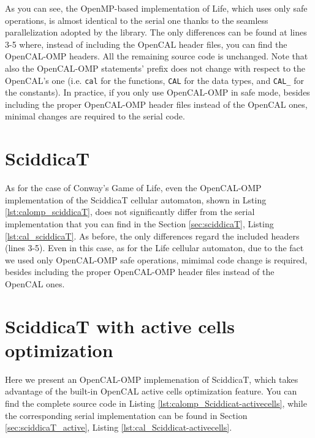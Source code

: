 As you can see, the OpenMP-based implementation of Life, which uses
only safe operations, is almost identical to the serial one thanks to the seamless parallelization adopted by the library. 
The only differences can be found at lines 3-5 where, instead of including the
OpenCAL header files, you can find the OpenCAL-OMP headers. All the
remaining source code is unchanged. Note that also the OpenCAL-OMP
statements' prefix does not change with respect to the OpenCAL's one
(i.e. \verb'cal' for the functions, \verb'CAL' for the data types, and
\verb'CAL_' for the constants). In practice, if you only use
OpenCAL-OMP in safe mode, besides including the proper OpenCAL-OMP
header files instead of the OpenCAL ones, minimal changes are required to the
serial code.

\section{SciddicaT}

As for the case of Conway's Game of Life, even the OpenCAL-OMP
implementation of the SciddicaT cellular automaton, shown in Lsting
\ref{lst:calomp_sciddicaT}, does not significantly differ from the
serial implementation that you can find in the Section
\ref{sec:sciddicaT}, Listing \ref{lst:cal_sciddicaT}. As before, the
only differences regard the included headers (lines 3-5). Even in this case, as for the Life cellular automaton, due to the fact we
used only OpenCAL-OMP safe operations, mimimal code change is required, besides including the proper
OpenCAL-OMP header files instead of the OpenCAL ones.



\section{SciddicaT with active cells optimization}
Here we present an OpenCAL-OMP implemenation of SciddicaT, which takes
advantage of the built-in OpenCAL active cells optimization feature. You can
find the complete source code in Listing
\ref{lst:calomp_Sciddicat-activecells}, while the corresponding serial
implementation can be found in Section
\ref{sec:sciddicaT_active}, Listing
\ref{lst:cal_Sciddicat-activecells}.



